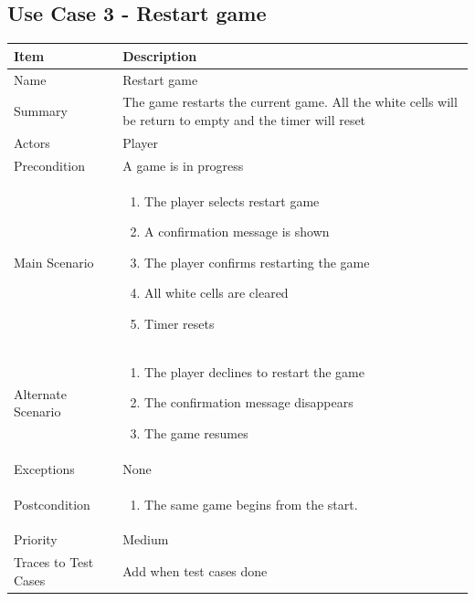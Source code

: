 \documentclass[12pt]{article}
\begin{document}
\newpage


\subsection{Use Case 3 - Restart game}

\begin{center}
\setlength{\tabcolsep}{18pt}
\renewcommand{\arraystretch}{1.3}
\begin{tabular}{ |p{3.4cm}|p{10cm}| }
    \hline
    
   \textbf{Item} & \textbf{Description} \\
    \hline
    Name & Restart game \\
    \hline
    Summary & The game restarts the current game. All the white cells will be return to empty and the timer will reset \\
    \hline
    Actors & Player \\
    \hline
    Precondition & A game is in progress \\
    \hline
    Main Scenario &     
    \vspace*{-0.1in}
    \begin{enumerate}[leftmargin=0.2in]
    \item The player selects restart game
    \item A confirmation message is shown
    \item The player confirms restarting the game
    \item All white cells are cleared
    \item Timer resets
    \end{enumerate}  \\
    \hline
    Alternate Scenario & \vspace*{-0.1in}
    \begin{enumerate}[leftmargin=0.2in]
    \item The player declines to restart the game
    \item The confirmation message disappears
    \item The game resumes
    \end{enumerate}  \\
    \hline
    Exceptions &  None\\
    \hline
    Postcondition & 
    \vspace*{-0.1in}
    \begin{enumerate}[leftmargin=0.2in]
        \item The same game begins from the start.
    \end{enumerate}  \\
    \hline
    Priority & Medium  \\
    \hline
    Traces to Test Cases & Add when test cases done  \\
    \hline
\end{tabular}
\end{center}
\end{document}
